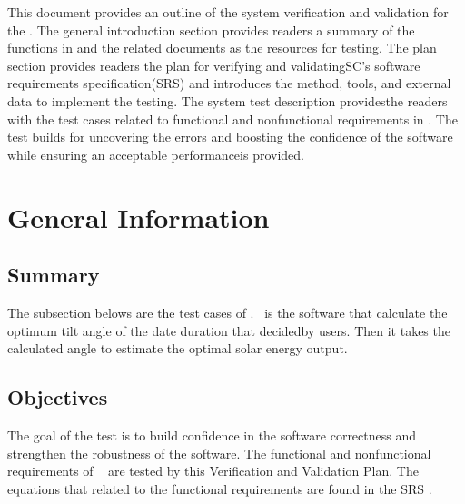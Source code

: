 \documentclass[12pt, titlepage]{article}
\begin{document}

\newpage


This document provides an outline of the system verification and validation for
the \progname. The general introduction section provides readers a summary of
the functions in \progname and the related documents as the resources for
testing. The plan section provides readers the plan for verifying and
validatingSC's software requirements specification(SRS) and introduces the
method, tools, and external data to implement the testing. The system test
description
providesthe readers with the test cases related to functional and nonfunctional
requirements in \progname. The test builds for uncovering the errors and
boosting the confidence of the software while ensuring an acceptable
performanceis provided. 



\section{General Information}
\subsection{Summary}

The subsection belows are the test cases of \progname. \progname ~is the
software that calculate the optimum tilt angle of the date duration that
decidedby users. Then it takes the calculated angle to estimate the optimal
solar energy output.


\subsection{Objectives}\label{Objectives}
The goal of the test is to build confidence in the software correctness and
strengthen the robustness of the software. The functional and nonfunctional
requirements of \progname~ are tested by this Verification and Validation Plan.
The equations that related to the functional requirements are found in the SRS
\cite{YS2019}. 
\end{document}
